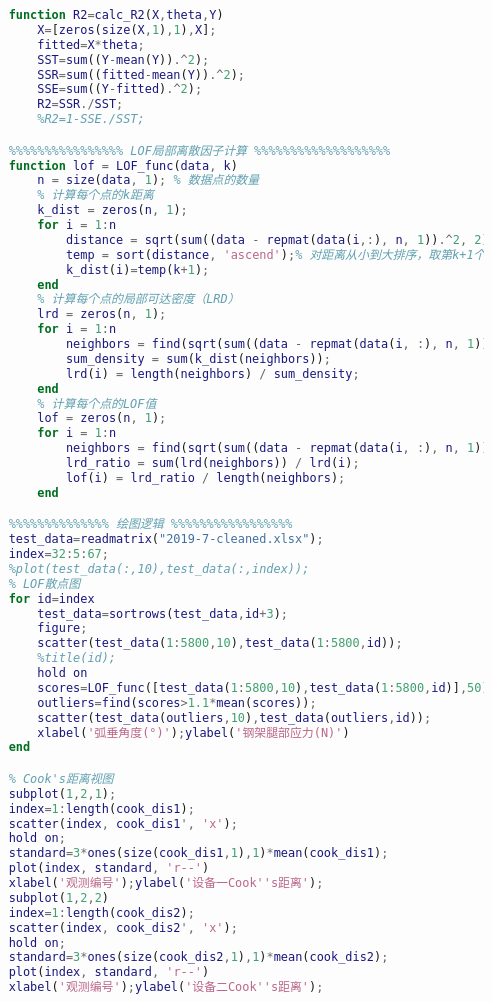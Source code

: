 \documentclass[withoutpreface,bwprint]{cumcmthesis}  %
\begin{document}
\begin{appendices}
\begin{lstlisting}[language=matlab]
    %%%%%%%%%%%%%%%%%%%%% 拟合优度计算 %%%%%%%%%%%%%%%%%%%%%%%%%%%
    function R2=calc_R2(X,theta,Y)
        X=[zeros(size(X,1),1),X];
        fitted=X*theta;
        SST=sum((Y-mean(Y)).^2);
        SSR=sum((fitted-mean(Y)).^2);
        SSE=sum((Y-fitted).^2);
        R2=SSR./SST;
        %R2=1-SSE./SST;

    %%%%%%%%%%%%%%%% LOF局部离散因子计算 %%%%%%%%%%%%%%%%%%%
    function lof = LOF_func(data, k)  
        n = size(data, 1); % 数据点的数量  
        % 计算每个点的k距离  
        k_dist = zeros(n, 1);  
        for i = 1:n  
            distance = sqrt(sum((data - repmat(data(i,:), n, 1)).^2, 2));  
            temp = sort(distance, 'ascend');% 对距离从小到大排序，取第k+1个值 
            k_dist(i)=temp(k+1);
        end  
        % 计算每个点的局部可达密度（LRD）  
        lrd = zeros(n, 1);  
        for i = 1:n  
            neighbors = find(sqrt(sum((data - repmat(data(i, :), n, 1)).^2, 2)) <= k_dist(i));  
            sum_density = sum(k_dist(neighbors));  
            lrd(i) = length(neighbors) / sum_density;  
        end  
        % 计算每个点的LOF值  
        lof = zeros(n, 1);  
        for i = 1:n  
            neighbors = find(sqrt(sum((data - repmat(data(i, :), n, 1)).^2, 2)) <= k_dist(i));  
            lrd_ratio = sum(lrd(neighbors)) / lrd(i);  
            lof(i) = lrd_ratio / length(neighbors);  
        end  

    %%%%%%%%%%%%%% 绘图逻辑 %%%%%%%%%%%%%%%%%
    test_data=readmatrix("2019-7-cleaned.xlsx");
    index=32:5:67;
    %plot(test_data(:,10),test_data(:,index));
    % LOF散点图
    for id=index
        test_data=sortrows(test_data,id+3);
        figure;
        scatter(test_data(1:5800,10),test_data(1:5800,id));
        %title(id);
        hold on
        scores=LOF_func([test_data(1:5800,10),test_data(1:5800,id)],50);
        outliers=find(scores>1.1*mean(scores));
        scatter(test_data(outliers,10),test_data(outliers,id));
        xlabel('弧垂角度(°)');ylabel('钢架腿部应力(N)')
    end

    % Cook's距离视图
    subplot(1,2,1);
    index=1:length(cook_dis1);
    scatter(index, cook_dis1', 'x');
    hold on;
    standard=3*ones(size(cook_dis1,1),1)*mean(cook_dis1);
    plot(index, standard, 'r--')
    xlabel('观测编号');ylabel('设备一Cook''s距离');
    subplot(1,2,2)
    index=1:length(cook_dis2);
    scatter(index, cook_dis2', 'x');
    hold on;
    standard=3*ones(size(cook_dis2,1),1)*mean(cook_dis2);
    plot(index, standard, 'r--')
    xlabel('观测编号');ylabel('设备二Cook''s距离');


\end{lstlisting}
\end{appendices}
\end{document}
